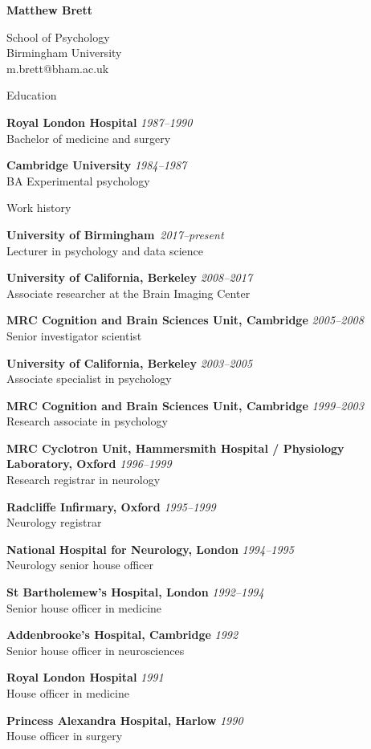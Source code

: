\documentclass{cv}
\newcommand{\PlaceDate}[2]{{\bf #1} \hfill {\em #2} \\}
\newcommand{\PlaceDateNote}[3]{{\bf #1} \hfill {\em #2} \\#3}
\newcommand{\UCB}{University of California, Berkeley}
\newcommand{\UoB}{University of Birmingham\,}
\newcommand{\CBU}{MRC Cognition and Brain Sciences Unit, Cambridge}
\begin{document}
\nocite{*}

{\huge \bf Matthew Brett}

School of Psychology \\
Birmingham University \\
m.brett@bham.ac.uk

\begin{cvSection}{Education}

\PlaceDate{Royal London Hospital}{1987--1990 }
Bachelor of medicine and surgery

\PlaceDateNote{Cambridge University}{1984--1987 }{
BA Experimental psychology}

\end{cvSection}

\begin{cvSection}{Work history}

\PlaceDateNote{\UoB}{2017--present }{
Lecturer in psychology and data science}

\PlaceDateNote{\UCB}{2008--2017 }{
Associate researcher at the Brain Imaging Center}

\PlaceDateNote{\CBU}{2005--2008}{
Senior investigator scientist}

\PlaceDateNote{\UCB}{2003--2005 }{
    Associate specialist in psychology}

\PlaceDateNote{\CBU}{1999--2003 }{
    Research associate in psychology}

\PlaceDateNote{
MRC Cyclotron Unit, Hammersmith Hospital / Physiology Laboratory, Oxford}
{1996--1999}
    {Research registrar in neurology}

\PlaceDateNote{Radcliffe Infirmary, Oxford}
{1995--1999}
{Neurology registrar}

\PlaceDateNote{National Hospital for Neurology, London}{1994--1995 }{
Neurology senior house officer}

\PlaceDateNote{St Bartholemew's Hospital, London}{1992--1994 }{
Senior house officer in medicine}

\PlaceDateNote{Addenbrooke's Hospital, Cambridge}{1992 }{
Senior house officer in neurosciences}

\PlaceDateNote{Royal London Hospital}{1991 }{
House officer in medicine}

\PlaceDateNote{Princess Alexandra Hospital, Harlow}{1990 }{
House officer in surgery}

\end{cvSection}
\end{document}
